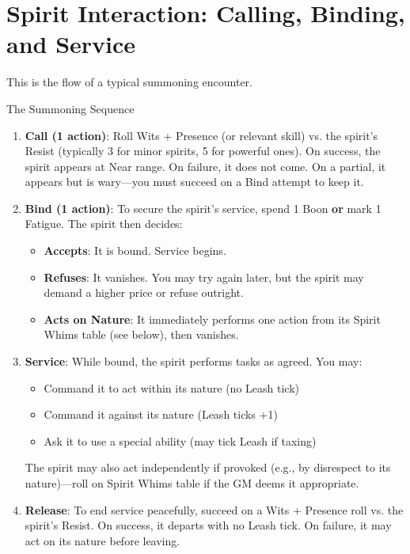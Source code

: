 \documentclass[11pt,twoside]{book}
\begin{document}
\section{Spirit Interaction: Calling, Binding, and Service}
This is the flow of a typical summoning encounter.

\begin{mechbox}{The Summoning Sequence}
  \begin{enumerate}
    \item \textbf{Call (1 action)}: Roll Wits + Presence (or relevant skill) vs. the spirit's Resist (typically 3 for minor spirits, 5 for powerful ones). On success, the spirit appears at Near range. On failure, it does not come. On a partial, it appears but is wary---you must succeed on a Bind attempt to keep it.
    \item \textbf{Bind (1 action)}: To secure the spirit's service, spend 1 Boon \textbf{or} mark 1 Fatigue. The spirit then decides:
      \begin{itemize}
        \item \textbf{Accepts}: It is bound. Service begins.
        \item \textbf{Refuses}: It vanishes. You may try again later, but the spirit may demand a higher price or refuse outright.
        \item \textbf{Acts on Nature}: It immediately performs one action from its Spirit Whims table (see below), then vanishes.
      \end{itemize}
    \item \textbf{Service}: While bound, the spirit performs tasks as agreed. You may:
      \begin{itemize}
        \item Command it to act within its nature (no Leash tick)
        \item Command it against its nature (Leash ticks +1)
        \item Ask it to use a special ability (may tick Leash if taxing)
      \end{itemize}
      The spirit may also act independently if provoked (e.g., by disrespect to its nature)---roll on Spirit Whims table if the GM deems it appropriate.
    \item \textbf{Release}: To end service peacefully, succeed on a Wits + Presence roll vs. the spirit's Resist. On success, it departs with no Leash tick. On failure, it may act on its nature before leaving.
  \end{enumerate}
\end{mechbox}
\end{document}

